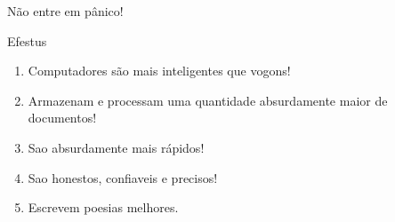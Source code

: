 {\vfill
\pagebreak


{\huge Não entre em pânico!}

\vfill
\pagebreak
%	
%
%
%
%	
%	
%
%

\vfill
\pagebreak

%


\vspace*{.75\textheight}
{\Huge Efestus}
 \vfill
\pagebreak


%
%		
%		
%		
%				
% 
\vfill
\pagebreak


	\Large
	
\begin{enumerate}
	\item Computadores são mais inteligentes que vogons!
	\item Armazenam e processam uma quantidade absurdamente maior de \nobreak documentos!
	\item Sao absurdamente mais rápidos!
	\item Sao honestos, confiaveis e precisos!
	\item Escrevem poesias melhores.
\end{enumerate}
	
}
